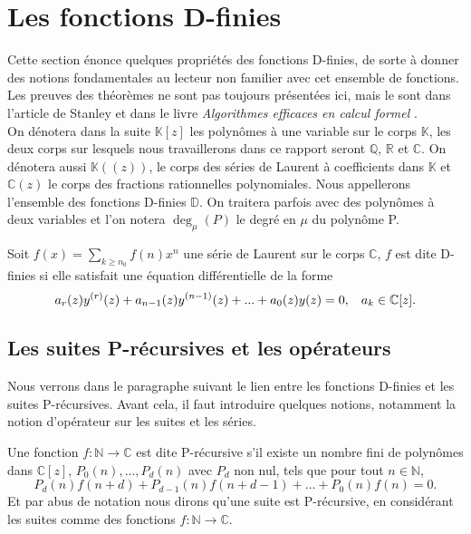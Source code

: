 \documentclass[a4paper,10pt]{article}
\begin{document}
	\section{Les fonctions D-finies}
	\label{sec:fonctionsD-finie}
	Cette section énonce quelques propriétés des fonctions D-finies, de sorte à donner des notions fondamentales au lecteur non familier avec cet ensemble de fonctions. Les preuves des théorèmes ne sont pas toujours présentées ici, mais le sont dans l'article de Stanley \cite{stanley1980differentiably}  et dans le livre \textit{Algorithmes efficaces en calcul formel} \cite[chap.14]{aecf-2017-livre}. 
	\\
	On dénotera dans la suite $\mathbb{K}[z]$ les polynômes à une variable sur le corps $\mathbb{K}$, les deux corps sur lesquels nous travaillerons dans ce rapport seront $\mathbb{Q}$, $\mathbb{R}$ et $\mathbb{C}$. On dénotera aussi $\mathbb{K}((z))$, le corps des séries de Laurent à coefficients dans $\mathbb{K}$ et $\mathbb{C}(z)$ le corps des fractions rationnelles polynomiales. Nous appellerons l'ensemble des fonctions D-finies $\mathbb{D}$. On traitera parfois avec des polynômes à deux variables et l'on notera $\deg_{\mu}(P)$ le degré en $\mu$ du polynôme P.
	
	\begin{definition}
		Soit $f(x)=\sum_{k\geq n_0}f(n)x^n$ une série de Laurent sur le corps $\mathbb{C}$, $f$ est dite  D-finies si elle satisfait une équation différentielle de la forme
		\begin{equation}
		a_{r}(z)y^{(r)}(z)+a_{n-1}(z)y^{(n-1)}(z)+...+a_{0}(z)y(z)=0, \hspace{3mm} a_{k}\in \mathbb{C}[z].
		\label{diff_eq}
		\end{equation}
	\end{definition}
	
	
	\subsection{Les suites P-récursives et les opérateurs}
	\label{subsec:P-recursives}
	 Nous verrons dans le paragraphe suivant le lien entre les fonctions D-finies et les suites P-récursives. Avant cela, il faut introduire quelques notions, notamment la notion d'opérateur sur les suites et les séries.
	 
	\begin{definition}
		Une fonction $f:\mathbb{N}\rightarrow \mathbb{C}$ est dite P-récursive s'il existe un nombre fini de polynômes dans $\mathbb{C}[z]$, $P_0(n),...,P_d(n)$ avec $P_d$ non nul, tels que pour tout $n\in \mathbb{N}$,
		\begin{equation}
		P_d(n)f(n+d)+P_{d-1}(n)f(n+d-1)+...+P_0(n)f(n)=0.
		\label{rec_eq}
		\end{equation}
		Et par abus de notation nous dirons qu'une suite est P-récursive, en considérant les suites comme des fonctions $f:\mathbb{N} \rightarrow \mathbb{C}.$
	\end{definition}  
\end{document}
